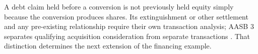 A debt claim held before a conversion is not previously held equity simply
because the conversion produces shares. Its extinguishment or other settlement
and any pre-existing relationship require their own transaction analysis;
AASB 3 separates qualifying acquisition consideration from separate
transactions \citep[paras.~51--52 and B50--B53]{aasb3scope2026}.
That distinction determines the next extension of the financing example.
